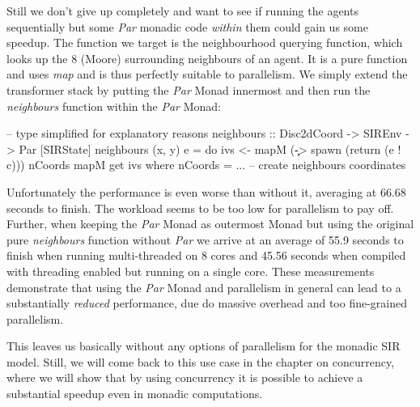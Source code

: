 Still we don't give up completely and want to see if running the agents sequentially but some \textit{Par} monadic code \textit{within} them could gain us some speedup. The function we target is the neighbourhood querying function, which looks up the 8 (Moore) surrounding neighbours of an agent. It is a pure function and uses \textit{map} and is thus perfectly suitable to parallelism. We simply extend the transformer stack by putting the \textit{Par} Monad innermost and then run the \textit{neighbours} function within the \textit{Par} Monad:

\begin{HaskellCode}
-- type simplified for explanatory reasons
neighbours :: Disc2dCoord -> SIREnv -> Par [SIRState]
neighbours (x, y) e = do
    ivs <- mapM (\c -> spawn (return (e ! c))) nCoords
    mapM get ivs
  where
    nCoords = ... -- create neighbours coordinates
\end{HaskellCode}

Unfortunately the performance is even worse than without it, averaging at 66.68 seconds to finish. The workload seems to be too low for parallelism to pay off. Further, when keeping the \textit{Par} Monad as outermost Monad but using the original pure \textit{neighbours} function without \textit{Par} we arrive at an average of 55.9 seconds to finish when running multi-threaded on 8 cores and 45.56 seconds when compiled with threading enabled but running on a single core. These measurements demonstrate that using the \textit{Par} Monad and parallelism in general can lead to a substantially \textit{reduced} performance, due do massive overhead and too fine-grained parallelism.

This leaves us basically without any options of parallelism for the monadic SIR model. Still, we will come back to this use case in the chapter on concurrency, where we will show that by using concurrency it is possible to achieve a substantial speedup even in monadic computations.